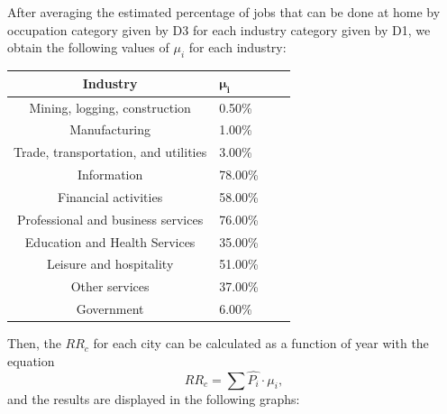 \documentclass{article}
\begin{document}
After averaging the estimated percentage of jobs that can be done at home by occupation category given by D3 for each industry category given by D1, we obtain the following values of $\mu_i$ for each industry:
\newpage
\begin{table}[ht]
\centering
\begin{tabularx}{210pt}{|c|X|c|X|}
\hline
    \textbf{Industry} &  $\mathbf{\mu_i}$ \\ \hline
    Mining, logging, construction & 0.50\% \\ \hline
    Manufacturing & 1.00\% \\ \hline
    Trade, transportation, and utilities & 3.00\% \\ \hline
    Information & 78.00\% \\ \hline
    Financial activities & 58.00\% \\ \hline
    Professional and business services & 76.00\% \\ \hline
    Education and Health Services & 35.00\% \\ \hline
    Leisure and hospitality & 51.00\% \\ \hline
    Other services & 37.00\% \\ \hline
    Government & 6.00\% \\ \hline
\end{tabularx}
\end{table}

Then, the $RR_c$ for each city can be calculated as a function of year with the equation
\[
    RR_c = \sum \hat{P_i} \cdot \mu_i,
\]
and the results are displayed in the following graphs:
\
\end{document}
